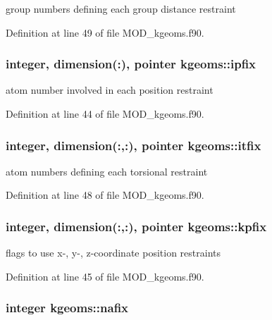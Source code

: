 group numbers defining each group distance restraint 



Definition at line 49 of file M\-O\-D\-\_\-kgeoms.\-f90.

\hypertarget{classkgeoms_a2b30f0d48f82ead39fb52021f77dd4e8}{
\subsubsection[{ipfix}]{\setlength{\rightskip}{0pt plus 5cm}integer, dimension(\-:), pointer kgeoms\-::ipfix}}\label{classkgeoms_a2b30f0d48f82ead39fb52021f77dd4e8}


atom number involved in each position restraint 



Definition at line 44 of file M\-O\-D\-\_\-kgeoms.\-f90.

\hypertarget{classkgeoms_a3fa72d434ebb88f36815c2840622ebae}{
\subsubsection[{itfix}]{\setlength{\rightskip}{0pt plus 5cm}integer, dimension(\-:,\-:), pointer kgeoms\-::itfix}}\label{classkgeoms_a3fa72d434ebb88f36815c2840622ebae}


atom numbers defining each torsional restraint 



Definition at line 48 of file M\-O\-D\-\_\-kgeoms.\-f90.

\hypertarget{classkgeoms_ab2178e14a7915308f33ca5a540b6dae5}{
\subsubsection[{kpfix}]{\setlength{\rightskip}{0pt plus 5cm}integer, dimension(\-:,\-:), pointer kgeoms\-::kpfix}}\label{classkgeoms_ab2178e14a7915308f33ca5a540b6dae5}


flags to use x-\/, y-\/, z-\/coordinate position restraints 



Definition at line 45 of file M\-O\-D\-\_\-kgeoms.\-f90.

\hypertarget{classkgeoms_a539c42cb6c28aca001ec53b4c901268b}{
\subsubsection[{nafix}]{\setlength{\rightskip}{0pt plus 5cm}integer kgeoms\-::nafix}}\label{classkgeoms_a539c42cb6c28aca001ec53b4c901268b}



